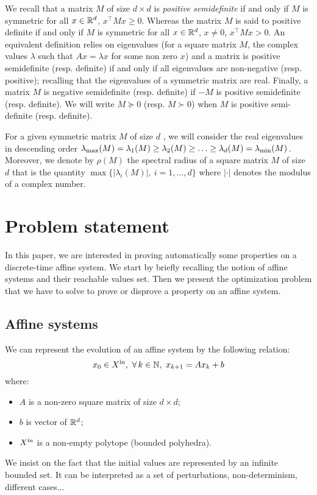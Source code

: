 \documentclass[10pt]{article}
\begin{document}
We recall that a matrix $M$ of size $d\times d$ is {\it positive semidefinite} if and only if $M$ is symmetric for all $x\in\mathbb R^d$,
$x^\intercal M x\geq 0$. Whereas the matrix $M$ is said to positive definite if and only if $M$ is symmetric for all $x\in\mathbb R^d$, $x\neq 0$, 
$x^\intercal M x>0$. An equivalent definition relies on eigenvalues (for a square matrix $M$, the complex values $\lambda$ such that $Ax=\lambda x$ for some non zero $x$) and a matrix is positive semidefinite (resp. definite) if and only if all eigenvalues are non-negative (resp. positive); recalling that the eigenvalues of a symmetric matrix are real.
Finally, a matrix $M$ is negative semidefinite (resp. definite) if $-M$ is positive semidefinite (resp. definite).
We will write $M\succeq 0$ (resp. $M\succ 0$)  when $M$ is positive semi-definite (resp. definite).

For a given symmetric matrix $M$ of size $d$ , we will consider the real eigenvalues in descending order   $\lambda_{\operatorname{max}}(M)=\lambda_1(M)\geq \lambda_2(M)\geq \ldots\geq \lambda_d(M)=\lambda_{\operatorname{min}}(M)$. Moreover, we denote by $\rho(M)$ the spectral radius of a square matrix $M$ of size $d$ that is the quantity $\max\{|\lambda_i(M)|,\ i=1,\ldots,d\}$ where $|\cdot|$ denotes the modulus of a complex number.

\section{Problem statement}
In this paper, we are interested in proving automatically some properties on a discrete-time affine system. We start by briefly recalling the notion of affine systems and their reachable values set. Then we present the optimization problem that we have to solve to prove or disprove a property on an affine system.

\subsection{Affine systems}

We can represent the evolution of an affine system by the following relation:
\begin{equation}
\label{context}
x_0\in X^\mathrm{in},\ \forall\, k\in\mathbb{N},\ x_{k+1}=A x_k + b  
\end{equation}
where:
\begin{itemize}
\item $A$ is a non-zero square matrix of size $d\times d$;
\item $b$ is vector of $\mathbb R^d$;
\item  $X^\mathrm{in}$ is a non-empty polytope (bounded polyhedra). 
\end{itemize}
We insist on the fact that the initial values are represented by an infinite bounded set. It can be interpreted as a set of perturbations, non-determinism, different cases...
\end{document}

